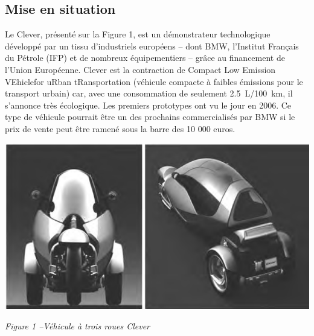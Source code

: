 \documentclass[10pt,fleqn]{article} %
\begin{document}

\vspace{4.5cm}
\pagestyle{fancy}
\thispagestyle{plain}

\def\columnseprulecolor{\color{ocre}}
\setlength{\columnseprule}{0.4pt} 

\def\pathfig{images}

\begin{multicols}{2}

\subsection*{Mise en situation}

Le Clever, présenté sur la Figure 1, est un démonstrateur technologique développé par un tissu d'industriels européens -- dont BMW, l'Institut Français du Pétrole (IFP) et de nombreux équipementiers -- grâce au financement de l'Union Européenne. Clever est la contraction de Compact Low Emission VEhiclefor uRban tRansportation (véhicule compacte à faibles émissions pour le transport urbain) car, avec une consommation de seulement \SI{2,5}{L/100 km}, il s'annonce très écologique. Les premiers prototypes ont vu le jour en 2006. Ce type de véhicule pourrait être un des prochains commercialisés par BMW si le prix de vente peut être ramené sous la barre des 10 000 euros.

    

\begin{center}
\includegraphics[width=.5\linewidth]{images/pt_01_Bis}

\textit{Figure 1 --Véhicule à trois roues Clever}
\end{center} 




\end{multicols}
\end{document}
